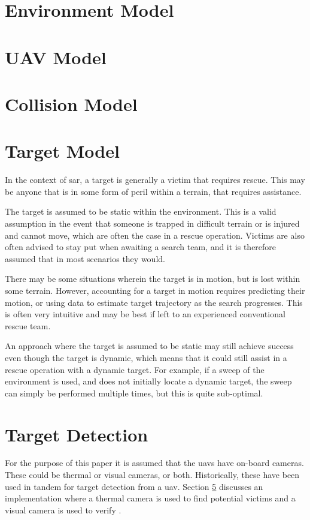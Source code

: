 \section{Environment Model}

\section{UAV Model}
\section{Collision Model}

\section{Target Model}
In the context of \ac{sar}, a target is generally a victim that requires rescue. This may be anyone that is in some form of peril within a terrain, that requires assistance.

The target is assumed to be static within the environment. This is a valid assumption in the event that someone is trapped in difficult terrain or is injured and cannot move, which are often the case in a rescue operation. Victims are also often advised to stay put when awaiting a search team, and it is therefore assumed that in most scenarios they would.

There may be some situations wherein the target is in motion, but is lost within some terrain. However, accounting for a target in motion requires predicting their motion, or using data to estimate target trajectory as the search progresses. This is often very intuitive and may be best if left to an experienced conventional rescue team. 

An approach where the target is assumed to be static may still achieve success even though the target is dynamic, which means that it could still assist in a rescue operation with a dynamic target. For example, if a sweep of the environment is used, and does not initially locate a dynamic target, the sweep can simply be performed multiple times, but this is quite sub-optimal.
\section{Target Detection}
For the purpose of this paper it is assumed that the \acp{uav} have on-board cameras. These could be thermal or visual cameras, or both. Historically, these have been used in tandem for target detection from a \ac{uav}. Section \ref{} discusses an implementation where a thermal camera is used to find potential victims and a visual camera is used to verify \cite{}. 

